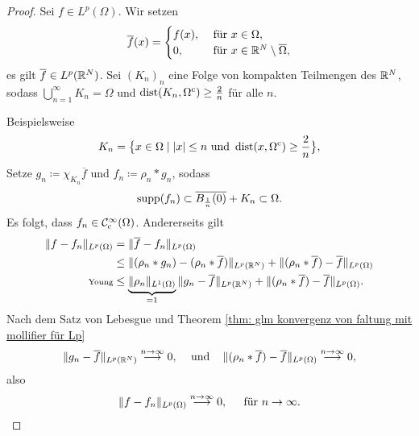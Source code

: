 \begin{proof}
	Sei \(f\in L^p(\Omega)\). Wir setzen
	\begin{equation*}
		\overline{f}(x)=
		\begin{cases}
			f(x),&\text{ für }x\in\Omega,\\
			0,&\text{ für }x\in\mathbb{R}^N\setminus\overline{\Omega},
		\end{cases}
	\end{equation*}
	es gilt \(\overline{f}\in L^p(\mathbb{R}^N)\). Sei \((K_n)_n\) eine Folge von kompakten Teilmengen des \(\mathbb{R}^N\), sodass \(\bigcup_{n=1}^\infty K_n=\Omega\) und \(\operatorname{dist}(K_n,\Omega^{\mathrm{c}})\geq\frac{2}{n}\) für alle \(n\).\vspace{4cm}
	
	
	\noindent Beispielsweise
	\begin{equation*}
		K_n=\big\{x\in\Omega\mid|x|\leq n\text{ und }\operatorname{dist}(x,\Omega^{\mathrm{c}})\geq\frac{2}{n}\big\},
	\end{equation*}
	Setze \(g_n\coloneqq\chi_{K_n}\overline{f}\) und \(f_n\coloneqq\rho_n\ast g_n\), sodass
	\begin{equation*}
		\operatorname{supp}(f_n)\subset\overline{B_\frac{1}{n}(0)}+K_n\subset\Omega.
	\end{equation*}
	Es folgt, dass \(f_n\in\mathcal{C}_{\mathrm{c}}^\infty(\Omega)\). Andererseits gilt
	\begin{align*}
		\|f-f_n\|_{L^p(\Omega)}&=\|\overline{f}-f_n\|_{L^p(\Omega)}\\
		&\leq\|(\rho_n\ast g_n)-(\rho_n\ast\overline{f})\|_{L^p(\mathbb{R}^N)}+\|(\rho_n\ast\overline{f})-\overline{f}\|_{L^p(\Omega)}\\
		\text{\scriptsize Young}&\leq\underbrace{\|\rho_n\|_{L^1(\Omega)}}_{=1}\|g_n-\overline{f}\|_{L^p(\mathbb{R}^N)}+\|(\rho_n\ast\overline{f})-\overline{f}\|_{L^p(\Omega)}.
	\end{align*}
	Nach dem Satz von Lebesgue und Theorem \ref{thm: glm konvergenz von faltung mit mollifier für Lp}
	\begin{equation*}
		\|g_n-\overline{f}\|_{L^p(\mathbb{R}^N)}\overset{n\rightarrow\infty}{\longrightarrow}0,\;\;\;\text{ und } \;\;\;\|(\rho_n\ast\overline{f})-\overline{f}\|_{L^p(\Omega)}\overset{n\rightarrow\infty}{\longrightarrow}0,
	\end{equation*}
	also
	\begin{equation*}
		\|f-f_n\|_{L^p(\Omega)}\overset{n\rightarrow\infty}{\longrightarrow}0,\;\;\;\;\text{ für }n\rightarrow\infty.
	\end{equation*}
\end{proof}

